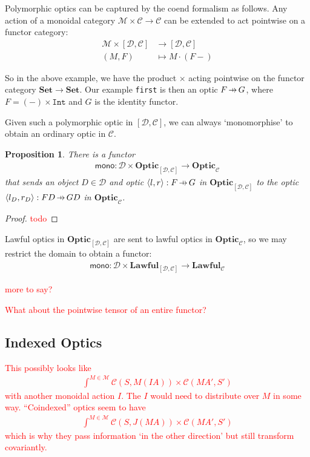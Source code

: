 \documentclass[11pt,a4paper]{article}
\theoremstyle{plain}
\newtheorem{proposition}[theorem]{Proposition}
\theoremstyle{definition}
\newcommand{\C}{\mathscr{C}}
\newcommand{\D}{\mathscr{D}}
\newcommand{\M}{\mathscr{M}}
\newcommand{\Set}{\mathbf{Set}}
\newcommand{\Optic}{\mathbf{Optic}}
\newcommand{\Lawful}{\mathbf{Lawful}}
\newcommand{\hto}{\ensuremath{\,\mathaccent\shortmid\rightarrow\,}}
\newcommand{\todo}[1]{\textcolor{red}{\small #1}}
\begin{document}
Polymorphic optics can be captured by the coend formalism as follows. Any action of a monoidal category $\M \times \C \to \C$ can be extended to act pointwise on a functor category:
\begin{align*}
\M \times [\D, \C] &\to [\D, \C] \\
(M, F) &\mapsto  M \cdot (F-)
\end{align*}

So in the above example, we have the product $\times$ acting pointwise on the functor category $\Set \to \Set$. Our example \texttt{first} is then an optic $F \hto G$, where $F = (-) \times \mathtt{Int}$ and $G$ is the identity functor.

Given such a polymorphic optic in $[\D, \C]$, we can always `monomorphise' to obtain an ordinary optic in $\C$.
\begin{proposition}
There is a functor 
\begin{align*}
\mathsf{mono} : \D \times \Optic_{[\D, \C]} \to \Optic_\C
\end{align*}
that sends an object $D \in \D$ and optic $\langle l, r \rangle : F \hto G$ in $\Optic_{[\D, \C]}$ to the optic $\langle l_D, r_D \rangle : FD \hto GD$ in $\Optic_\C$.
\end{proposition}
\begin{proof}
\todo{todo}
\end{proof}

Lawful optics in $\Optic_{[\D, \C]}$ are sent to lawful optics in $\Optic_\C$,  so we may restrict the domain to obtain a functor:
\begin{align*}
\mathsf{mono} : \D \times \Lawful_{[\D, \C]} \to \Lawful_\C
\end{align*}

\todo{more to say?}

\todo{What about the pointwise tensor of an entire functor?}


\subsection{Indexed Optics}
\todo{
This possibly looks like
\begin{align*}
\int^{M \in \M} \C(S, M(IA)) \times \C(M A', S')
\end{align*}
with another monoidal action $I$. The $I$ would need to distribute over $M$ in some way. ``Coindexed'' optics seem to have 
\begin{align*}
\int^{M \in \M} \C(S, J(MA)) \times \C(M A', S')
\end{align*}
which is why they pass information `in the other direction' but still transform covariantly.
}
\end{document}
